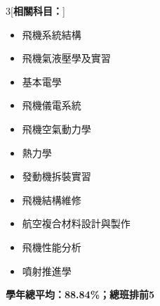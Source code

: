 \documentclass[11 pt,oneside,a4paper,titlepage]{article}
\begin{document}
{\begin{minipage}{13.1cm}
{        \begin{multicols}{3}[\textbf{相關科目：}]
        \begin{itemize}[label=\faCaretRight]
            \item 飛機系統結構
            \item 飛機氣液壓學及實習
            \item 基本電學
            \item 飛機儀電系統
            \item 飛機空氣動力學
            \item 熱力學
            \item 發動機拆裝實習
            \item 飛機結構維修
            \item 航空複合材料設計與製作
            \item 飛機性能分析
            \item 噴射推進學
        \end{itemize}
        \end{multicols}
        \textbf{學年總平均：88.84\%；總班排前5}}

    \end{minipage}} %
\newpage

\end{document}
